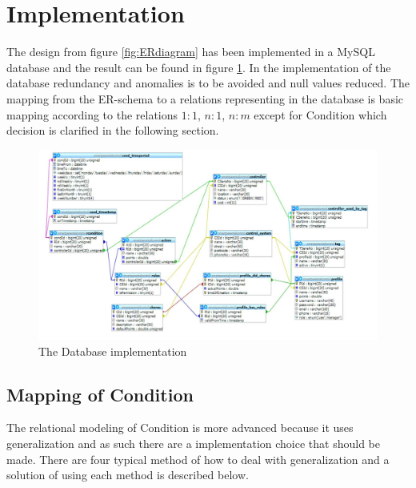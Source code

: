 \section{Implementation}

The design from figure \ref{fig:ERdiagram} has been implemented in a MySQL database and the result can be found in figure \ref{fig:databaseDiagram}. In the implementation of the database redundancy and anomalies is to be avoided and null values reduced. 
The mapping from the ER-schema to a relations representing in the database is basic mapping according to the relations $1:1$, $n:1$, $n:m$ except for Condition which decision is clarified in the following section. 

\begin{figure}
	\centering
		\includegraphics[width=1.00\textwidth]{images/databaseDiagram.jpg}
	\caption{The Database implementation}
	\label{fig:databaseDiagram}
\end{figure}

\subsection{Mapping of Condition}
\label{subsec:mappRule}
The relational modeling of Condition is more advanced because it uses generalization and as such there are a implementation choice that should be made. There are four typical method of how to deal with generalization and a solution of using each method is described below.

